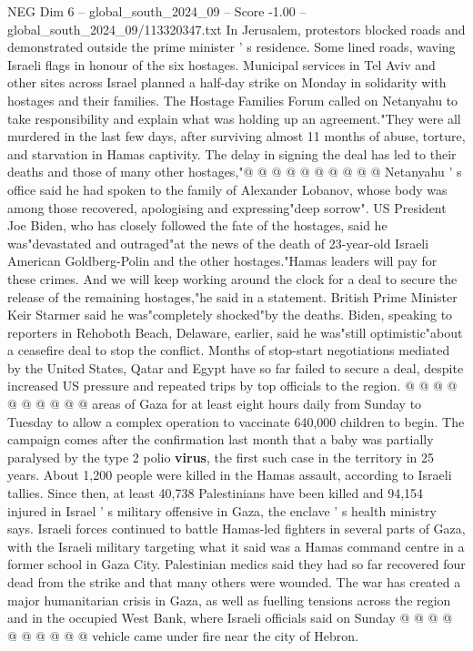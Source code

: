 \begin{textsample}{NEG Dim 6 – global\_south\_2024\_09 – Score -1.00 – global\_south\_2024\_09/113320347.txt}
In Jerusalem, protestors blocked roads and demonstrated outside the prime minister ' s residence.
Some lined roads, waving Israeli flags in honour of the six hostages.
Municipal services in Tel Aviv and other sites across Israel planned a half-day strike on Monday in solidarity with hostages and their families.
The Hostage Families Forum called on Netanyahu to take responsibility and explain what was holding up an agreement."They were all murdered in the last few days, after surviving almost 11 months of abuse, torture, and starvation in Hamas captivity.
The delay in signing the deal has led to their deaths and those of many other hostages,"@ @ @ @ @ @ @ @ @ @ Netanyahu ' s office said he had spoken to the family of Alexander Lobanov, whose body was among those recovered, apologising and expressing"deep sorrow".
US President Joe Biden, who has closely followed the fate of the hostages, said he was"devastated and outraged"at the news of the death of 23-year-old Israeli American Goldberg-Polin and the other hostages."Hamas leaders will pay for these crimes.
And we will keep working around the clock for a deal to secure the release of the remaining hostages,"he said in a statement.
British Prime Minister Keir Starmer said he was"completely shocked"by the deaths.
Biden, speaking to reporters in Rehoboth Beach, Delaware, earlier, said he was"still optimistic"about a ceasefire deal to stop the conflict.
Months of stop-start negotiations mediated by the United States, Qatar and Egypt have so far failed to secure a deal, despite increased US pressure and repeated trips by top officials to the region. @ @ @ @ @ @ @ @ @ @ areas of Gaza for at least eight hours daily from Sunday to Tuesday to allow a complex operation to vaccinate 640,000 children to begin.
The campaign comes after the confirmation last month that a baby was partially paralysed by the type 2 polio \textbf{virus}, the first such case in the territory in 25 years.
About 1,200 people were killed in the Hamas assault, according to Israeli tallies.
Since then, at least 40,738 Palestinians have been killed and 94,154 injured in Israel ' s military offensive in Gaza, the enclave ' s health ministry says.
Israeli forces continued to battle Hamas-led fighters in several parts of Gaza, with the Israeli military targeting what it said was a Hamas command centre in a former school in Gaza City.
Palestinian medics said they had so far recovered four dead from the strike and that many others were wounded.
The war has created a major humanitarian crisis in Gaza, as well as fuelling tensions across the region and in the occupied West Bank, where Israeli officials said on Sunday @ @ @ @ @ @ @ @ @ @ vehicle came under fire near the city of Hebron.

\end{textsample}
